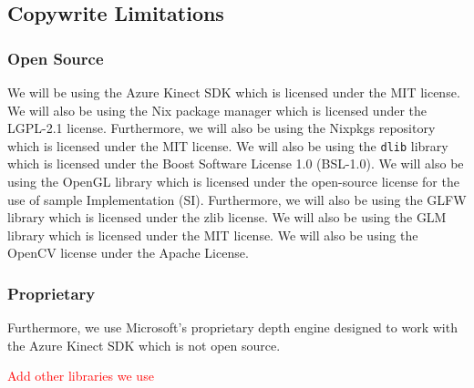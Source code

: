 \subsection{Copywrite Limitations}
\subsubsection{Open Source}
We will be using the Azure Kinect SDK which is licensed under the MIT license. We will also be using the Nix package manager which is licensed under the LGPL-2.1 license. Furthermore, we will also be using the Nixpkgs repository which is licensed under the MIT license. We will also be using the \texttt{dlib} library which is licensed under the Boost Software License 1.0 (BSL-1.0). We will also be using the OpenGL library which is licensed under the open-source license for the use of sample Implementation (SI). Furthermore, we will also be using the GLFW library which is licensed under the zlib license. We will also be using the GLM library which is licensed under the MIT license. We will also be using the OpenCV license under the Apache License.

\subsubsection{Proprietary}
Furthermore, we use Microsoft's proprietary depth engine designed to work with the Azure Kinect SDK which is not open source.

\textcolor{red}{Add other libraries we use}